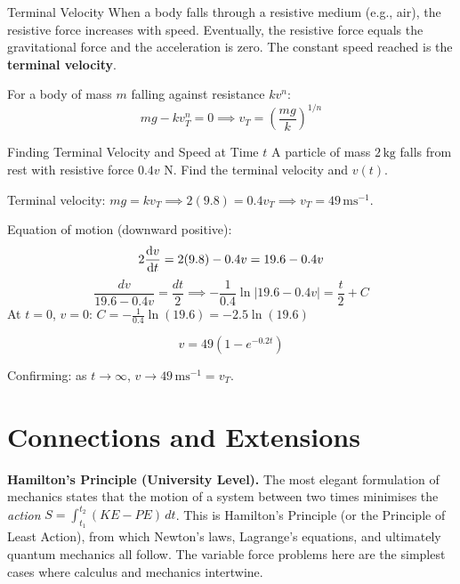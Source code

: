 \documentclass[12pt, a4paper]{book}
\newcommand{\ms}{\,\mathrm{ms}^{-1}}
\newcommand{\kg}{\,\mathrm{kg}}
\newcommand{\N}{\,\mathrm{N}}
\begin{document}
\begin{defn}{Terminal Velocity}{}
When a body falls through a resistive medium (e.g., air), the resistive force increases with speed. Eventually, the resistive force equals the gravitational force and the acceleration is zero. The constant speed reached is the \textbf{terminal velocity}.

For a body of mass $m$ falling against resistance $kv^n$:
\[
  mg - kv_T^n = 0 \implies v_T = \left(\frac{mg}{k}\right)^{1/n}
\]
\end{defn}

\begin{exmp}{Finding Terminal Velocity and Speed at Time $t$}{}
A particle of mass $2\kg$ falls from rest with resistive force $0.4v\,\N$. Find the terminal velocity and $v(t)$.

\medskip
Terminal velocity: $mg = kv_T \implies 2(9.8) = 0.4v_T \implies v_T = 49\ms$.

Equation of motion (downward positive):
\[
  2\dv{v}{t} = 2(9.8) - 0.4v = 19.6 - 0.4v
\]
\[
  \frac{dv}{19.6 - 0.4v} = \frac{dt}{2} \implies -\frac{1}{0.4}\ln|19.6 - 0.4v| = \frac{t}{2} + C
\]
At $t = 0$, $v = 0$: $C = -\frac{1}{0.4}\ln(19.6) = -2.5\ln(19.6)$

\[
  v = 49\left(1 - e^{-0.2t}\right)
\]

Confirming: as $t \to \infty$, $v \to 49\ms = v_T$. \checkmark
\end{exmp}

\section{Connections and Extensions}

\begin{explorationbox}
\textbf{Hamilton's Principle (University Level).}
The most elegant formulation of mechanics states that the motion of a system between two times minimises the \emph{action} $S = \int_{t_1}^{t_2}(KE - PE)\,dt$. This is Hamilton's Principle (or the Principle of Least Action), from which Newton's laws, Lagrange's equations, and ultimately quantum mechanics all follow. The variable force problems here are the simplest cases where calculus and mechanics intertwine.
\end{explorationbox}
\end{document}

